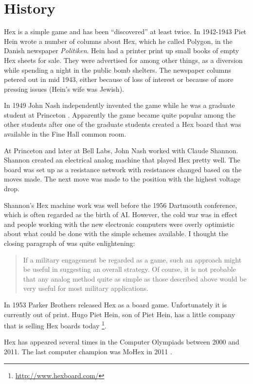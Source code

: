 \documentclass[12pt,titlepage]{amsart}
\begin{document}
\section{History}

Hex is a simple game and has been ``discovered'' at least twice. In 1942-1943
Piet Hein wrote a number of columns about Hex, which he called Polygon, in the
Danish newspaper \emph{Politiken}. Hein had a printer print up small books of
empty Hex sheets for sale. They were advertised for among other things, as a
diversion while spending a night in the public bomb shelters. The newspaper
columns petered out in mid 1943, either because of loss of interest or because
of more pressing issues (Hein's wife was Jewish).

In 1949 John Nash independently invented the game while he was a graduate
student at Princeton \cite{Nash:1952:Games}. Apparently the game became quite
popular among the other students after one of the graduate students created a
Hex board that was available in the Fine Hall common room.

At Princeton and later at Bell Labs, John Nash worked with Claude Shannon.
Shannon created an electrical analog machine that played Hex pretty well. The
board was set up as a resistance network with resistances changed based on the
moves made. The next move was made to the position with the highest voltage
drop.

Shannon's Hex machine work was well before the 1956 Dartmouth conference, which
is often regarded as the birth of AI. However, the cold war was in effect and
people working with the new electronic computers were overly optimistic about
what could be done with the simple schemes available. I thought the closing
paragraph  of \cite{Nash:1952:Games} was quite enlightening:

\begin{quote}
If a military engagement be regarded as a game, such an approach might be useful
in suggesting an overall strategy. Of course, it is not probable that any analog
method quite as simple as those described above would be very useful for most
military applications.
\end{quote}

In 1953 Parker Brothers released Hex as a board game. Unfortunately it is
currently out of print. Hugo Piet Hein, son of Piet Hein, has a little company
that is selling Hex boards today \footnote{\url{http://www.hexboard.com/}}.

Hex has appeared several times in the Computer Olympiads between 2000 and 2011.
The last computer champion was MoHex in 2011 \cite{Henderson:2010}.
\end{document}
